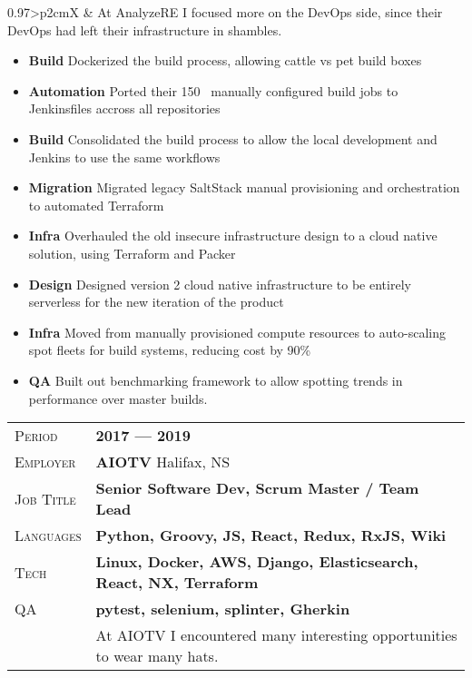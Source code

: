 \documentclass[a4paper, oneside, final]{scrartcl}
\newcommand{\gray}{\rowcolor[gray]{.90}}
\begin{document}
\begin{center}
\begin{tabularx}{0.97\linewidth}{>{\raggedleft\scshape}p{2cm}X}
& At AnalyzeRE I focused more on the DevOps side, since their DevOps had left their infrastructure in shambles.

\begin{itemize}
\item \textbf {Build} Dockerized the build process, allowing cattle vs pet build boxes
\item \textbf {Automation} Ported their 150~ manually configured build jobs to Jenkinsfiles accross all repositories
\item \textbf {Build} Consolidated the build process to allow the local development and Jenkins to use the same workflows
\item \textbf {Migration} Migrated legacy SaltStack manual provisioning and orchestration to automated Terraform
\item \textbf {Infra} Overhauled the old insecure infrastructure design to a cloud native solution, using Terraform and Packer
\item \textbf {Design} Designed version 2 cloud native infrastructure to be entirely serverless for the new iteration of the product
\item \textbf {Infra} Moved from  manually provisioned compute resources to auto-scaling spot fleets for build systems, reducing cost by 90\%
\item \textbf {QA} Built out benchmarking framework to allow spotting trends in performance over master builds.

\end{itemize}

\end{tabularx}

\begin{tabularx}{0.97\linewidth}{>{\raggedleft\scshape}p{2cm}X}
\gray Period & \textbf{2017 --- 2019}\\
\gray Employer & \textbf{AIOTV} \hfill Halifax, NS\\
\gray Job Title & \textbf{Senior Software Dev, Scrum Master / Team Lead}\\
\gray Languages & \textbf{Python, Groovy, JS, React, Redux, RxJS, Wiki}\\
\gray Tech & \textbf{Linux, Docker, AWS, Django, Elasticsearch, React, NX, Terraform}\\
\gray QA& \textbf{pytest, selenium, splinter, Gherkin}\\
& At AIOTV I encountered many interesting opportunities to wear many hats.


\end{tabularx}
\end{center}
\end{document}
